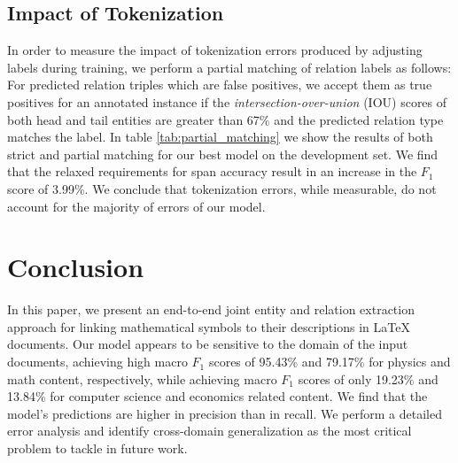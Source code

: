 \documentclass[11pt]{article}
\begin{document}
\subsection{Impact of Tokenization}


\begin{table}
\centering
{}
\caption{\label{tab:partial_matching} Comparison of strict and partial matching requirements with respect to classification scores on the development set.}
\end{table}


In order to measure the impact of tokenization errors produced by adjusting labels during training, we perform a partial matching of relation labels as follows:
For predicted relation triples which are false positives, we accept them as true positives for an annotated instance if the \textit{intersection-over-union} (IOU) scores of both head and tail entities are greater than 67\% and the predicted relation type matches the label. In table \ref{tab:partial_matching} we show the results of both strict and partial matching for our best model on the development set.
We find that the relaxed requirements for span accuracy result in an increase in the $F_1$ score of 3.99\%. 
We conclude that tokenization errors, while measurable, do not account for the majority of errors of our model.





\section{Conclusion}



In this paper, we present an end-to-end joint entity and relation extraction approach for linking mathematical symbols to their descriptions in LaTeX documents.
Our model appears to be sensitive to the domain of the input documents, achieving high macro $F_1$ scores of 95.43\% and 79.17\% for physics and math content, respectively, while achieving macro $F_1$ scores of only 19.23\% and 13.84\% for computer science and economics related content.
We find that the model's predictions are higher in precision than in recall.
We perform a detailed error analysis and identify cross-domain generalization as the most critical problem to tackle in future work.
\end{document}
